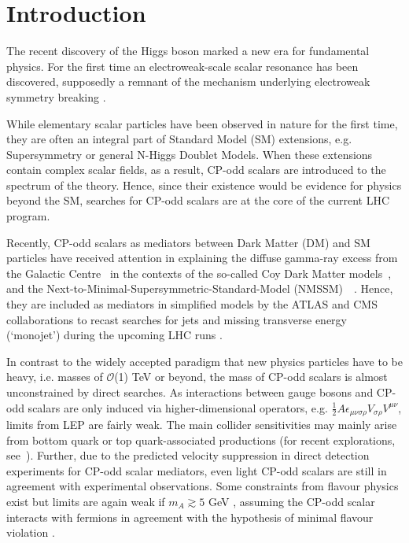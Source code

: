 \documentclass[preprintnumbers,superscriptaddress,nofootinbib,aps,prd,floatfix]{revtex4}
\begin{document}
\section{Introduction}
\label{sec:intro}
The recent discovery of the Higgs boson \cite{Chatrchyan:2012ufa,Aad:2012tfa} marked a new era for fundamental physics. For the first time an electroweak-scale scalar resonance has been discovered, supposedly a remnant of the mechanism underlying electroweak symmetry breaking \cite{orig}.

While elementary scalar particles have been observed in nature for the first time, they are often an integral part of Standard Model (SM) extensions, e.g. Supersymmetry or general N-Higgs Doublet Models. When these extensions contain complex scalar fields, as a result, CP-odd scalars are introduced to the spectrum of the theory. Hence, since their existence would be evidence for physics beyond the SM, searches for CP-odd scalars are at the core of the 
current LHC program. 

Recently, CP-odd scalars as mediators between Dark Matter (DM) and SM particles have received attention in explaining the diffuse gamma-ray excess from the Galactic Centre~\cite{Goodenough:2009gk,Hooper:2010mq,Abazajian:2012pn,Daylan:2014rsa} in the contexts of the so-called Coy Dark Matter models~\cite{Boehm:2014hva,Hektor:2014kga,Arina:2014yna}, and the Next-to-Minimal-Supersymmetric-Standard-Model (NMSSM)~~\cite{Cheung:2014lqa,Huang:2014cla}. Hence, they are included as mediators in simplified models by the ATLAS and CMS collaborations to recast searches for  jets and missing transverse energy (`monojet') during the upcoming LHC runs \cite{Malik:2014ggr,Abdallah:2014hon}.

In contrast to the widely accepted paradigm that new physics particles have to be heavy, i.e. masses of $\mathcal{O}$(1) TeV or beyond, the mass of CP-odd scalars is almost unconstrained by direct searches. As interactions between gauge bosons and CP-odd scalars are only induced via higher-dimensional operators, e.g. $\frac{1}{2} A \epsilon_{\mu \nu \sigma \rho} V_{\sigma \rho} V^{\mu \nu}$, limits from LEP are fairly weak. The main collider sensitivities may mainly arise from bottom quark or top quark-associated productions (for recent explorations, see~\cite{Craig:2015jba,Hajer:2015gka}). Further, due to the predicted velocity suppression in direct detection experiments for CP-odd scalar mediators, even light CP-odd scalars are still in agreement with experimental observations. Some constraints from flavour physics exist but limits are again weak if $m_A \gtrsim 5$ GeV \cite{Dolan:2014ska}, assuming the CP-odd scalar interacts with fermions in agreement with the hypothesis of minimal flavour violation \cite{D'Ambrosio:2002ex}. 
\end{document}

